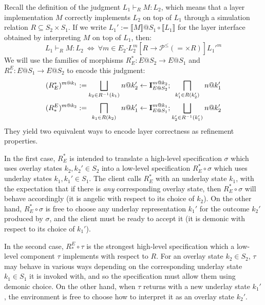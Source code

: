 \documentclass[11pt,oneside,draft]{book}
\theoremstyle{definition}
\newcommand{\bdot}{\boldsymbol{\cdot}}
\begin{document}
Recall the definition of
the judgment $L_1 \vdash_R M : L_2$,
which means that a layer implementation $M$
correctly implements $L_2$ on top of $L_1$
through a simulation relation $R \subseteq S_2 \times S_1$.
If we write
$L_1' := \llbracket M \rrbracket @ S_1 \circ \llbracket L_1 \rrbracket$
for the layer interface obtained
by interpreting $M$ on top of $L_1$,
then:
\[
  L_1 \vdash_R M : L_2 \:\Leftrightarrow\:
  \forall m \in E_2 \bdot
    L_2^m
    \mathrel{[R \rightarrow \mathcal{P}^\le({=} \times R)]}
    {L_1'}^m
\]
We will use the families of morphisms
$R^*_E : E@S_2 \rightarrow E@S_1$ and
$R_*^E : E@S_1 \rightarrow E@S_2$
to encode this judgment:
\[
  {\everymath={\displaystyle}
  \begin{array}{r@{\:}c@{\:}c@{\:}c@{\:}l}
  (R^*_E)^{m@k_1} := &
    \bigsqcup_{k_2 \in R^{-1}(k_1)} &
    n@k_2' \leftarrow \mathbf{I}^{m@k_2}_{E@S_2} ; &
    \bigsqcap_{k_1' \in R(k_2')} &
    n@k_1' \\[4ex]
  (R_*^E)^{m@k_2} := &
    \bigsqcap_{k_1 \in R(k_2)} &
    n@k_1' \leftarrow \mathbf{I}^{m@k_1}_{E@S_1} ; &
    \bigsqcup_{k_2' \in R^{-1}(k_1')} &
    n@k_2'
  \end{array}}
\]
They yield two equivalent ways to encode
layer correctness as refinement properties.

In the first case,
$R^*_E$ is intended to translate
a high-level specification $\sigma$
which uses overlay states $k_2, k_2' \in S_2$
into a low-level specification $R^*_E \circ \sigma$
which uses underlay states
$k_1, k_1' \in S_1$.
The client calls $R^*_E$
with an underlay state $k_1$,
with the expectation that if there is \emph{any}
corresponding overlay state,
then $R^*_E \circ \sigma$ will behave accordingly
(it is angelic with respect to its choice of $k_2$).
On the other hand,
$R^*_E \circ \sigma$ is free to choose any underlay representation
$k_1'$
for the outcome $k_2'$ produced by $\sigma$,
and the client must be ready to accept it
(it is demonic with respect to its choice of $k_1'$).

In the second case,
$R_*^E \circ \tau$ is %
the strongest high-level specification
which a low-level component $\tau$ implements
with respect to $R$.
For an overlay state $k_2 \in S_2$,
$\tau$ may behave in various ways
depending on the corresponding underlay state $k_1 \in S_1$
it is invoked with,
and so the specification must allow them using demonic choice.
On the other hand,
when $\tau$ returns with a new underlay state $k_1'$,
the environment is free to choose
how to interpret it as an overlay state $k_2'$.
\end{document}
